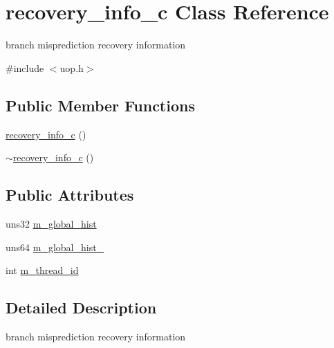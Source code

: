 \hypertarget{classrecovery__info__c}{
\section{recovery\_\-info\_\-c Class Reference}
\label{classrecovery__info__c}
}


branch misprediction recovery information  




{\ttfamily \#include $<$uop.h$>$}

\subsection*{Public Member Functions}
\begin{DoxyCompactItemize}
\item 
\hyperlink{classrecovery__info__c_a47f03dbfec8ad3a53274a0d63b8e08c3}{recovery\_\-info\_\-c} ()
\item 
\hyperlink{classrecovery__info__c_a76ba8f1a24189ddd876c5eb08cf2fc4a}{$\sim$recovery\_\-info\_\-c} ()
\end{DoxyCompactItemize}
\subsection*{Public Attributes}
\begin{DoxyCompactItemize}
\item 
uns32 \hyperlink{classrecovery__info__c_aa4e7499fc8b15e669f054591f65ac457}{m\_\-global\_\-hist}
\item 
uns64 \hyperlink{classrecovery__info__c_ae900e8c2b0de1acdfa6ddd05419d2ceb}{m\_\-global\_\-hist\_}
\item 
int \hyperlink{classrecovery__info__c_a2d39830ee723d6c7d34f3c7ced497bdf}{m\_\-thread\_\-id}
\end{DoxyCompactItemize}


\subsection{Detailed Description}
branch misprediction recovery information 

